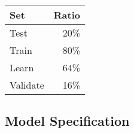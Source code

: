 \documentclass[12pt]{diazessay}
\begin{document}
\begin{table}[!htbp] \centering 
	\caption{Distribution for partitioning dataset,
		stratified by \texttt{\textquotesingle{}Elo\ Rank\textquotesingle{}}}
	\label{tab:shrunk-observations}
\begin{longtable}[]{@{}lr@{}}
\toprule
Set & Ratio \\
\midrule
\endhead
Test & 20\% \\
Train & 80\% \\
Learn & 64\% \\
Validate & 16\% \\
\bottomrule
\end{longtable}
\end{table}

\hypertarget{model-specification}{%
\subsection{Model Specification}\label{model-specification}}
\end{document}

